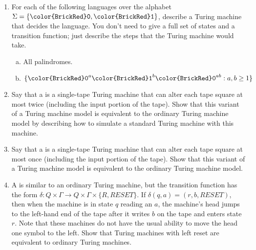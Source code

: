 \documentclass[11pt]{article}
\def\Sym#1{\texttt{\color{BrickRed}#1}}
\begin{document}


\begin{enumerate}
\item 
For each of the following languages over the alphabet $\Sigma = \{\Sym0, \Sym1\}$, describe a Turing machine that decides the language. You don't need to give a full set of states and a transition function; just describe the steps that the Turing machine would take.
\begin{enumerate}[(a)]
    \item All palindromes.
    \item $\{\Sym0^a\Sym1^b\Sym0^{ab} : a,b \geq 1\}$
\end{enumerate}

\item Say that a  is a single-tape Turing
machine that can alter each tape square at most twice (including the input
portion of the tape). Show that this variant of a Turing machine model is
equivalent to the ordinary Turing machine model by describing how to simulate
a standard Turing machine with this machine.

\item Say that a  is a single-tape Turing machine that can alter
each tape square at most once (including the input portion of the tape). Show that this variant of a Turing machine model is equivalent to the ordinary Turing machine model.

\item A  is similar to an ordinary Turing
machine, but the transition function has the form $\delta: Q \times \Gamma \to Q
\times \Gamma \times \{R, RESET\}$. If $\delta(q,a) = (r, b, RESET)$, then when
the machine is in state $q$ reading an $a$, the machine's head jumps to the
left-hand end of the tape after it writes $b$ on the tape and enters state $r$.
Note that these machines do not have the usual ability to move the head one
symbol to the left. Show that Turing machines with left reset are equivalent to
ordinary Turing machines.
\end{enumerate}
\end{document}
